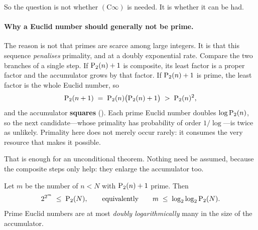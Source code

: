 \smallskip\noindent
So the question is not whether $(\mathrm{C}\infty)$ is needed.  It is
whether it can be had.

\paragraph{Why a Euclid number should generally not be prime.}
The reason is not that primes are scarce among large integers.  It is
that this sequence \emph{penalises} primality, and at a doubly
exponential rate.  Compare the two branches of a single step.  If
$\mathrm{P}_{2}(n)+1$ is composite, its least factor is a proper factor and the
accumulator grows by that factor.  If $\mathrm{P}_{2}(n)+1$ is prime, the least
factor is the whole Euclid number, so
\[
  \mathrm{P}_{2}(n+1) \;=\; \mathrm{P}_{2}(n)\bigl(\mathrm{P}_{2}(n)+1\bigr)
  \;>\; \mathrm{P}_{2}(n)^2 ,
\]
and the accumulator \textbf{squares}
().
Each prime Euclid number doubles $\log \mathrm{P}_{2}(n)$, so the next
candidate---whose primality has probability of order $1/\log$---is twice
as unlikely.  Primality here does not merely occur rarely: it consumes
the very resource that makes it possible.

That is enough for an unconditional theorem.  Nothing need be assumed,
because the composite steps only help: they enlarge the accumulator too.

\begin{theorem}
\label{thm:self-limiting}
Let $m$ be the number of $n < N$ with $\mathrm{P}_{2}(n)+1$ prime.  Then
\[
  2^{2^{m}} \;\leq\; \mathrm{P}_{2}(N),
  \qquad\text{equivalently}\qquad
  m \;\leq\; \log_2 \log_2 \mathrm{P}_{2}(N) .
\]
Prime Euclid numbers are at most \emph{doubly logarithmically} many in
the size of the accumulator.
\end{theorem}

